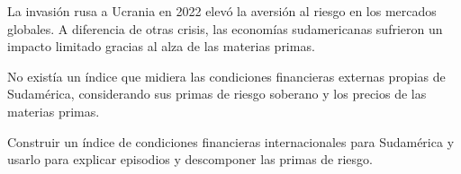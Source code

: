 \documentclass{article}
\newcommand{\bodysize}{\fontsize{27}{35.6}\selectfont}
\newcommand{\cardtitlesize}{\fontsize{31.9}{38.3}\selectfont}
\newcommand{\smallsize}{\fontsize{22.1}{28.7}\selectfont}
\newcommand{\cardtitle}[2][navy]{{\color{#1}\cardtitlesize\bfseries\textls[110]{\MakeUppercase{#2}}}\par\vspace{7mm}}
\begin{document}
\vfill
\hspace*{34mm}\begin{minipage}{773mm}
\begin{tcolorbox}[enhanced, sharp corners, colback=navy, boxrule=0pt, left=16mm, right=16mm, top=12mm, bottom=11mm,
  fontupper=\bodysize\raggedright, overlay={\fill[gold] (frame.north west) rectangle ([yshift=-5mm]frame.north east);}]
\begin{minipage}[t]{237.7mm}\raggedright{\color{acento}\smallsize\bfseries{}}\par{}\end{minipage}\hfill\begin{minipage}[t]{237.7mm}\raggedright{\color{acento}\smallsize\bfseries{}}\par{}\end{minipage}\hfill\begin{minipage}[t]{237.7mm}\raggedright{\color{acento}\smallsize\bfseries{}}\par{}\end{minipage}
\end{tcolorbox}
\end{minipage}

\vfill
\hspace*{34mm}\begin{minipage}{773mm}
\begin{tcbraster}[raster columns=3, raster equal height, raster column skip=16mm]
\begin{tcolorbox}[card]\cardtitle{Contexto}La invasión rusa a Ucrania en 2022 elevó la aversión al riesgo en los mercados globales. A diferencia de otras crisis, las economías sudamericanas sufrieron un impacto limitado gracias al alza de las materias primas.\end{tcolorbox}
\begin{tcolorbox}[card]\cardtitle{Problema}No existía un índice que midiera las condiciones financieras externas propias de Sudamérica, considerando sus primas de riesgo soberano y los precios de las materias primas.\end{tcolorbox}
\begin{tcolorbox}[card]\cardtitle{Objetivo}Construir un índice de condiciones financieras internacionales para Sudamérica y usarlo para explicar episodios y descomponer las primas de riesgo.\end{tcolorbox}
\end{tcbraster}
\end{minipage}
\end{document}

